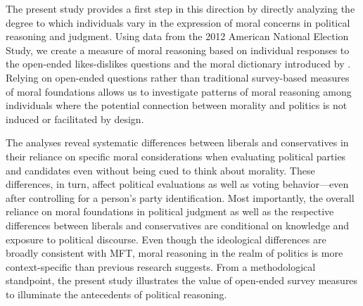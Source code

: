 \documentclass[12pt]{article}
\begin{document}

The present study provides a first step in this direction by directly analyzing the degree to which individuals vary in the expression of moral concerns in political reasoning and judgment. Using data from the 2012 American National Election Study, we create a measure of moral reasoning based on individual responses to the open-ended likes-dislikes questions and the moral dictionary introduced by \citet{graham2009liberals}. Relying on open-ended questions rather than traditional survey-based measures of moral foundations allows us to investigate patterns of moral reasoning among individuals where the potential connection between morality and politics is not induced or facilitated by design.

The analyses reveal systematic differences between liberals and conservatives in their reliance on specific moral considerations when evaluating political parties and candidates even without being cued to think about morality.
These differences, in turn, affect political evaluations as well as voting behavior---even after controlling for a person's party identification. Most importantly, the overall reliance on moral foundations in political judgment as well as the respective differences between liberals and conservatives are conditional on knowledge and exposure to political discourse. Even though the ideological differences are broadly consistent with MFT, moral reasoning in the realm of politics is more context-specific than previous research suggests. From a methodological standpoint, the present study illustrates the value of open-ended survey measures to illuminate the antecedents of political reasoning.
\end{document}
